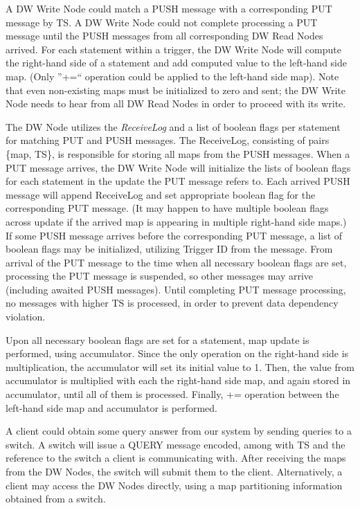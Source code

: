 \documentclass{sig-semester}
\begin{document}
A DW Write Node could match a PUSH message with a corresponding PUT message by TS. A DW Write Node could not complete processing a PUT message until the PUSH messages from all corresponding DW Read Nodes arrived. For each statement within a trigger, the DW Write Node will compute the right-hand side of a statement and add computed value to the left-hand side map. (Only ''+=`` operation could be applied to the left-hand side map). Note that even non-existing maps must be initialized to zero and sent; the DW Write Node needs to hear from all DW Read Nodes in order to proceed with its write.

The DW Node utilizes the \textit{ReceiveLog} and a list of boolean flags per statement for matching PUT and PUSH messages. The ReceiveLog, consisting of pairs \{map, TS\}, is responsible for storing all maps from the PUSH messages. When a PUT message arrives, the DW Write Node will initialize the lists of boolean flags for each statement in the update the PUT message refers to. Each arrived PUSH message will append ReceiveLog and set appropriate boolean flag for the corresponding PUT message. (It may happen to have multiple boolean flags across update if the arrived map is appearing in multiple right-hand side maps.) If some PUSH message arrives before the corresponding PUT message, a list of boolean flags may be initialized, utilizing Trigger ID from the message. From arrival of the PUT message to the time when all necessary boolean flags are set, processing the PUT message is suspended, so other messages may arrive (including awaited PUSH messages). Until completing PUT message processing, no messages with higher TS is processed, in order to prevent data dependency violation.

Upon all necessary boolean flags are set for a statement, map update is performed, using accumulator. Since the only operation on the right-hand side is multiplication, the accumulator will set its initial value to 1. Then, the value from accumulator is multiplied with each the right-hand side map, and again stored in accumulator, until all of them is processed. Finally, += operation between the left-hand side map and accumulator is performed.

A client could obtain some query answer from our system by sending queries to a switch. A switch will issue a QUERY message encoded, among with TS and the reference to the switch a client is communicating with. After receiving the maps from the DW Nodes, the switch will submit them to the client. Alternatively, a client may access the DW Nodes directly, using a map partitioning information obtained from a switch.
\end{document}
